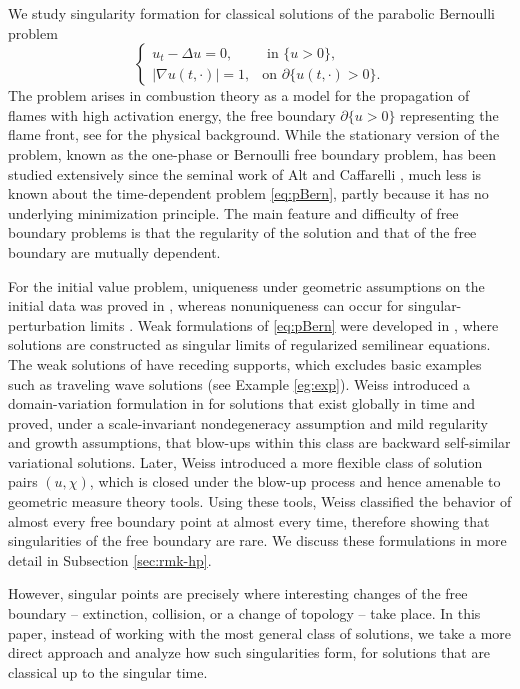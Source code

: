 \documentclass[11pt]{article}
\numberwithin{equation}{section}
\theoremstyle{definition}
\begin{document}
We study singularity formation for classical solutions of the parabolic Bernoulli problem
\begin{equation}\tag{B} \label{eq:pBern}
	\begin{cases}
u_t - \Delta u = 0, & \text{ in } \{u>0\}, \\
|\nabla u(t, \cdot)| = 1, & \text{on } \partial\{u(t, \cdot) > 0\}.
\end{cases}
\end{equation}
The problem arises in combustion theory as a model for the propagation of flames with high activation energy, the free boundary $\partial\{u>0\}$ representing the flame front, see \cite{BL} for the physical background. 
While the stationary version of the problem, known as the one-phase or Bernoulli free boundary problem, has been studied extensively since the seminal work of Alt and Caffarelli \cite{AC}, much less is known about the time-dependent problem \eqref{eq:pBern}, partly because it has no underlying minimization principle. The main feature and difficulty of free boundary problems is that the regularity of the solution and that of the free boundary are mutually dependent. 

For the initial value problem, uniqueness under geometric assumptions on the initial data was proved in \cite{Kim03,LVW01,Pet02}, whereas nonuniqueness can occur for singular-perturbation limits \cite{PY08}. 
Weak formulations of \eqref{eq:pBern} were developed in \cite{CV,  Weiss}, where solutions are constructed as singular limits of regularized semilinear equations.
The weak solutions of \cite{CV} have receding supports, which excludes basic examples such as traveling wave solutions (see Example \ref{eg:exp}). 
Weiss introduced a domain-variation formulation in \cite{Weiss99} for solutions that exist globally in time and proved, under a scale-invariant nondegeneracy assumption and mild regularity and growth assumptions, that blow-ups within this class are backward self-similar variational solutions. 
Later, Weiss \cite{Weiss} introduced a more flexible class of solution pairs $(u,\chi)$, which is closed under the blow-up process and hence amenable to geometric measure theory tools. Using these tools, Weiss classified the behavior of almost every free boundary point at almost every time, therefore showing that singularities of the free boundary are rare.  We discuss these formulations in more detail in Subsection \ref{sec:rmk-hp}.

However, singular points are precisely where interesting changes of the free boundary -- extinction, collision, or a change of topology -- take place. In this paper, instead of working with the most general class of solutions, we take a more direct approach and analyze how such singularities form, for solutions that are classical up to the singular time.
\end{document}
